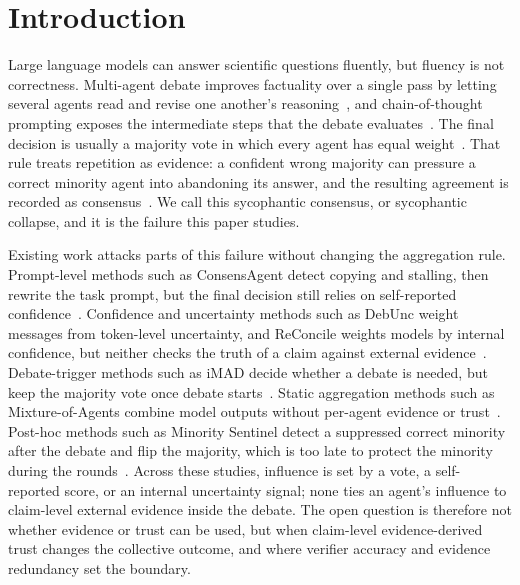 \documentclass[a4paper,fleqn]{cas-sc}
\begin{document}
\maketitle
\linenumbers
\section{Introduction}\label{sec1}

Large language models can answer scientific questions fluently, but fluency is not correctness. Multi-agent debate improves factuality over a single pass by letting several agents read and revise one another's reasoning~\cite{du2024improving}, and chain-of-thought prompting exposes the intermediate steps that the debate evaluates~\cite{wei2022chain}. The final decision is usually a majority vote in which every agent has equal weight~\cite{choi2025debate}. That rule treats repetition as evidence: a confident wrong majority can pressure a correct minority agent into abandoning its answer, and the resulting agreement is recorded as consensus~\cite{pitre-etal-2025-consensagent}. We call this sycophantic consensus, or sycophantic collapse, and it is the failure this paper studies.

Existing work attacks parts of this failure without changing the aggregation rule. Prompt-level methods such as ConsensAgent detect copying and stalling, then rewrite the task prompt, but the final decision still relies on self-reported confidence~\cite{pitre-etal-2025-consensagent}. Confidence and uncertainty methods such as DebUnc weight messages from token-level uncertainty, and ReConcile weights models by internal confidence, but neither checks the truth of a claim against external evidence~\cite{yoffe-etal-2025-debunc,chen2024reconcile}. Debate-trigger methods such as iMAD decide whether a debate is needed, but keep the majority vote once debate starts~\cite{fan2026imad}. Static aggregation methods such as Mixture-of-Agents combine model outputs without per-agent evidence or trust~\cite{wang2025mixture}. Post-hoc methods such as Minority Sentinel detect a suppressed correct minority after the debate and flip the majority, which is too late to protect the minority during the rounds~\cite{he2026minority}. Across these studies, influence is set by a vote, a self-reported score, or an internal uncertainty signal; none ties an agent's influence to claim-level external evidence inside the debate. The open question is therefore not whether evidence or trust can be used, but when claim-level evidence-derived trust changes the collective outcome, and where verifier accuracy and evidence redundancy set the boundary.
\end{document}
